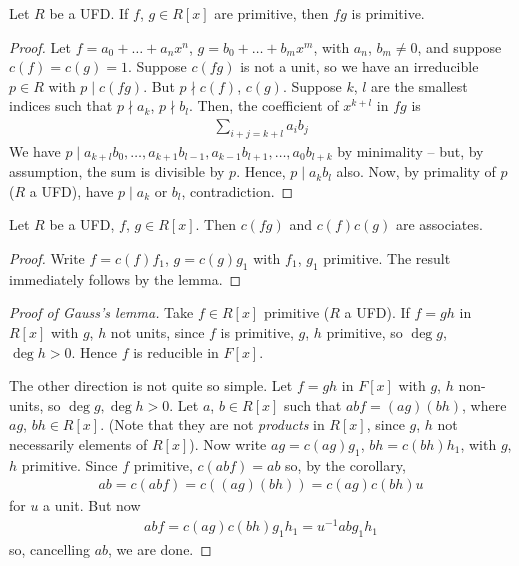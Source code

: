 \documentclass{../../template/note}
\begin{document}
    \begin{lemma}
        Let $R$ be a UFD. If $f$, $g \in R[x]$ are primitive, then $fg$ is primitive.
    \end{lemma}
    
    \begin{proof}
        Let $f = a_0 + \dots + a_nx^n$, $g = b_0 + \dots + b_mx^m$, with $a_n$, $b_m \neq 0$, and suppose $c(f) = c(g) = 1$. Suppose $c(fg)$ is not a unit, so we have an irreducible $p \in R$ with $p \mid c(fg)$. But $p \nmid c(f)$, $c(g)$. Suppose $k$, $l$ are the smallest indices such that $p \nmid a_k$, $p \nmid b_l$. Then, the coefficient of $x^{k+l}$ in $fg$ is
        \begin{align*}
            \sum_{i+j=k+l}a_ib_j
        \end{align*}
        We have $p \mid a_{k+l}b_0, \dots, a_{k+1}b_{l-1}, a_{k-1}b_{l+1}, \dots, a_0b_{l+k}$ by minimality -- but, by assumption, the sum is divisible by $p$. Hence, $p \mid a_kb_l$ also. Now, by primality of $p$ ($R$ a UFD), have $p \mid a_k$ or $b_l$, contradiction.        
    \end{proof}

    \begin{corollary}
        Let $R$ be a UFD, $f$, $g \in R[x]$. Then $c(fg)$ and $c(f)c(g)$ are associates.
    \end{corollary}
    
    \begin{proof}
        Write $f=c(f)f_1$, $g=c(g)g_1$ with $f_1$, $g_1$ primitive. The result immediately follows by the lemma.
    \end{proof}
    
    \begin{proof}[Proof of Gauss's lemma]
        Take $f \in R[x]$ primitive ($R$ a UFD). If $f = gh$ in $R[x]$ with $g$, $h$ not units, since $f$ is primitive, $g$, $h$ primitive, so $\deg g$, $\deg h > 0$. Hence $f$ is reducible in $F[x]$.

        The other direction is not quite so simple. Let $f=gh$ in $F[x]$ with $g$, $h$ non-units, so $\deg g, \deg h > 0$. Let $a$, $b \in R[x]$ such that $abf = (ag)(bh)$, where $ag$, $bh \in R[x]$. (Note that they are not \emph{products} in $R[x]$, since $g$, $h$ not necessarily elements of $R[x]$). Now write $ag = c(ag) g_1$, $bh = c(bh) h_1$, with $g$, $h$ primitive. Since $f$ primitive, $c(abf) = ab$ so, by the corollary,
        \begin{align*}
            ab = c(abf) = c((ag)(bh)) = c(ag)c(bh)u
        \end{align*}
        for $u$ a unit. But now
        \begin{align*}
            abf = c(ag)c(bh)g_1h_1 = u^{-1}abg_1h_1
        \end{align*}
        so, cancelling $ab$, we are done.
    \end{proof}
    
\end{document}
